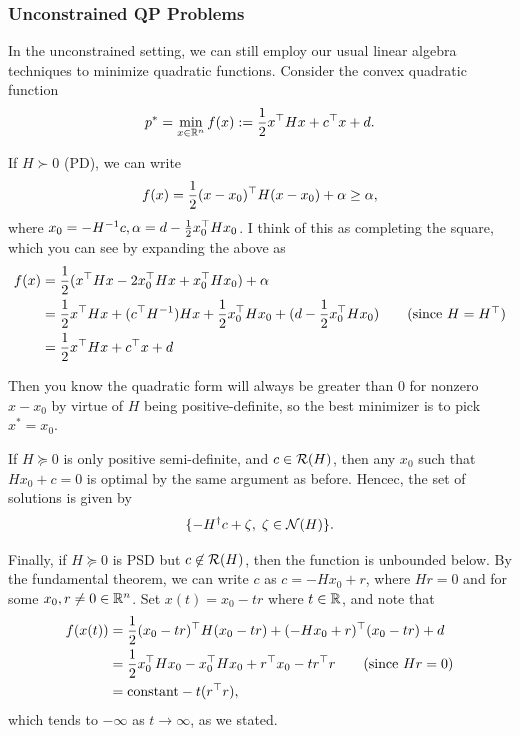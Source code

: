 \documentclass[11 pt]{scrartcl}
\begin{document}
\subsubsection{Unconstrained QP Problems}

In the unconstrained setting, we can still employ our usual linear algebra techniques to minimize quadratic functions. 
Consider the convex quadratic function 
\[ p^* = \min_{x\in \mathbb R^n} f(x) := \frac 12 x^\top H x + c^\top x + d.\] 

If $H\succ 0$ (PD), we can write 
\[ f(x) = \frac 12 (x-x_0)^\top H (x-x_0) + \alpha \geq \alpha,\] 
where $x_0 = -H^{-1}c, \alpha = d - \frac 12 x_0^\top H x_0$.
I think of this as completing the square, which you can see by expanding the above as 
\begin{align*}
    f(x) &= \frac 12 (x^\T H x - 2x_0^\T Hx + x_0^\T H x_0) + \alpha \\ 
         &= \frac 12 x^\T H x + (c^\T H^{-1}) H x + \frac 12 x_0^\T H x_0 + (d - \frac 12 x_0^\T H x_0)  \tag{since $H = H^\T$} \\ 
         &= \frac 12 x^\T H x + c^\T x + d 
\end{align*}

Then you know the quadratic form will always be greater than $0$ for nonzero $x-x_0$ by virtue of $H$ being positive-definite, so the best minimizer is to pick $x^* = x_0$.

If $H\succeq 0$ is only positive semi-definite, and $c\in \mathcal R(H)$, then any $x_0$ such that $Hx_0 + c = 0$ is optimal by the same argument as before. 
Hencec, the set of solutions is given by 
\[ \{-H^\dagger c + \zeta,\; \zeta \in \mathcal N(H)\}.\] 

Finally, if $H\succeq 0$ is PSD but $c\not\in \mathcal R(H)$, then the function is unbounded below.
By the fundamental theorem, we can write $c$ as $c = -Hx_0 + r$, where $Hr = 0$ and for some $x_0, r\not= 0 \in \mathbb R^n$.
Set $x(t) = x_0 - tr$ where $t\in \mathbb R$, and note that 
\begin{align*}
    f(x(t)) &= \frac 12 (x_0-tr)^\top H (x_0 - tr) + (-Hx_0 + r)^\top (x_0 - tr) + d \\ 
            &= \frac 12 x_0^\top H x_0  - x_0^\top H x_0 + r^\top x_0 - t r^\top r \tag{since $Hr = 0$}  \\ 
            &= \text{constant} - t(r^\top r),
\end{align*}
which tends to $-\infty$ as $t \to\infty$, as we stated. 
\end{document}
